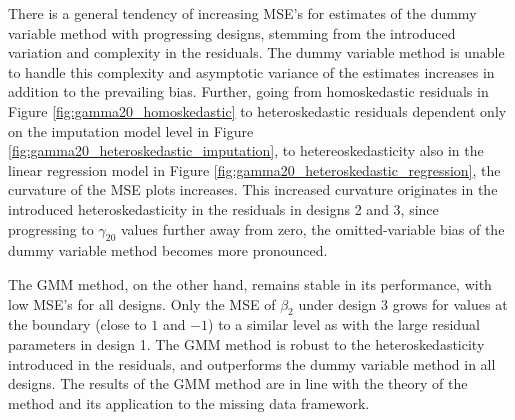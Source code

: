There is a general tendency of increasing MSE's for estimates of the dummy variable method with progressing designs, stemming from the introduced variation and complexity in the residuals.
The dummy variable method is unable to handle this complexity and asymptotic variance of the estimates increases in addition to the prevailing bias.
Further, going from homoskedastic residuals in Figure \ref{fig:gamma20_homoskedastic} to heteroskedastic residuals dependent only on the imputation model level in Figure \ref{fig:gamma20_heteroskedastic_imputation}, to hetereoskedasticity also in the linear regression model in Figure \ref{fig:gamma20_heteroskedastic_regression}, the curvature of the MSE plots increases.
This increased curvature originates in the introduced heteroskedasticity in the residuals in designs 2 and 3, since progressing to $\gamma_{20}$ values further away from zero, the omitted-variable bias of the dummy variable method becomes more pronounced.

The GMM method, on the other hand, remains stable in its performance, with low MSE's for all designs.
Only the MSE of $\beta_2$ under design 3 grows for values at the boundary (close to $1$ and $-1$) to a similar level as with the large residual parameters in design 1.
The GMM method is robust to the heteroskedasticity introduced in the residuals, and outperforms the dummy variable method in all designs.
The results of the GMM method are in line with the theory of the method and its application to the missing data framework.
